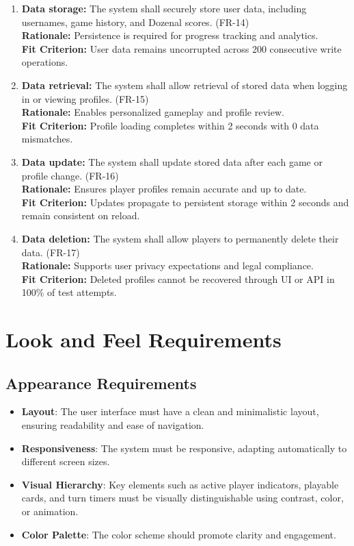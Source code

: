 \documentclass[12pt]{article}
\begin{document}
\begin{enumerate}
    \item \textbf{Data storage:} The system shall securely store user data, including usernames, game history, and Dozenal scores. (FR-14) \\
    \textbf{Rationale:} Persistence is required for progress tracking and analytics. \\
    \textbf{Fit Criterion:} User data remains uncorrupted across 200 consecutive write operations.

    \item \textbf{Data retrieval:} The system shall allow retrieval of stored data when logging in or viewing profiles. (FR-15) \\
    \textbf{Rationale:} Enables personalized gameplay and profile review. \\
    \textbf{Fit Criterion:} Profile loading completes within 2 seconds with 0 data mismatches.

    \item \textbf{Data update:} The system shall update stored data after each game or profile change. (FR-16) \\
    \textbf{Rationale:} Ensures player profiles remain accurate and up to date. \\
    \textbf{Fit Criterion:} Updates propagate to persistent storage within 2 seconds and remain consistent on reload.

    \item \textbf{Data deletion:} The system shall allow players to permanently delete their data. (FR-17) \\
    \textbf{Rationale:} Supports user privacy expectations and legal compliance. \\
    \textbf{Fit Criterion:} Deleted profiles cannot be recovered through UI or API in 100\% of test attempts.
\end{enumerate}


\section{Look and Feel Requirements}
\subsection{Appearance Requirements}
	\begin{itemize}
		\item \textbf{Layout}: The user interface must have a clean and minimalistic layout, ensuring readability and ease of navigation.
		\item \textbf{Responsiveness}: The system must be responsive, adapting automatically to different screen sizes.
		\item \textbf{Visual Hierarchy}: Key elements such as active player indicators, playable cards, and turn timers must be visually distinguishable using contrast, color, or animation.
		\item \textbf{Color Palette}: The color scheme should promote clarity and engagement.
	\end{itemize}
\end{document}
